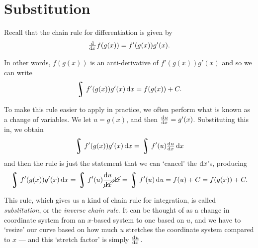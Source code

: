 \section{Substitution}
Recall that the chain rule for differentiation is given by
\begin{displaymath}
  \od{}{x} f(g(x)) = f'(g(x)) g'(x).
\end{displaymath}

In other words, $ f(g(x)) $ is an anti-derivative of $ f'(g(x)) g'(x) $ and so we can write
\begin{displaymath}
  \rint f'(g(x)) g'(x) \dif{x} = f(g(x)) + C.
\end{displaymath}

To make this rule easier to apply in practice, we often perform what is known as a change of variables. We
let $ u = g(x) $, and then $ \od{u}{x} = g'(x) $. Substituting this in, we obtain
\begin{displaymath}
  \rint f'(g(x)) g'(x) \dif{x} = \rint f'(u) \od{u}{x} \dif{x}
\end{displaymath}
and then the rule is just the statement that we can `cancel' the $ \dif{x} $'s, producing
\begin{displaymath}
  \rint f'(g(x)) g'(x) \dif{x} = \rint f'(u) \frac{\dif{u}}{\cancel{\dif{x}}} \cancel{\dif{x}} = \rint f'(u) \dif{u} = f(u) + C = f(g(x)) + C.
\end{displaymath}

This rule, which gives us a kind of chain rule for integration, is called \emph{substitution}, or the \emph{inverse chain rule}. It
can be thought of as a change in coordinate system from an $ x$-based system to one based on $ u $, and we have to `resize' our curve based
on how much $ u $ stretches the coordinate system compared to $ x $ --- and this `stretch factor' is simply $ \od{u}{x} $.

